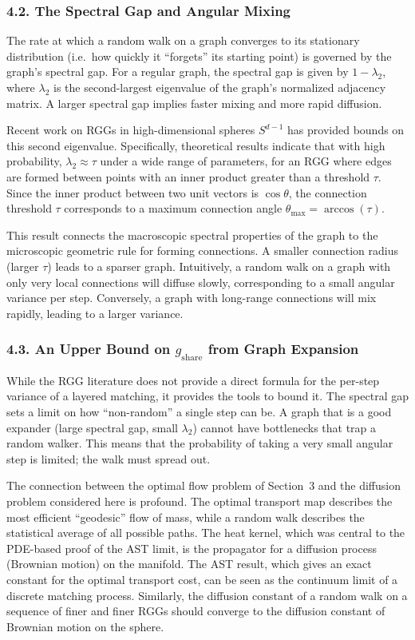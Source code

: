 \documentclass[11pt]{article}
\begin{document}
\subsubsection*{4.2. The Spectral Gap and Angular Mixing}
The rate at which a random walk on a graph converges to its stationary distribution (i.e.\ how quickly it “forgets” its starting point) is governed by the graph’s spectral gap. For a regular graph, the spectral gap is given by $1 - \lambda_2$, where $\lambda_2$ is the second-largest eigenvalue of the graph’s normalized adjacency matrix. A larger spectral gap implies faster mixing and more rapid diffusion.

Recent work on RGGs in high-dimensional spheres $S^{d-1}$ has provided bounds on this second eigenvalue. Specifically, theoretical results indicate that with high probability, $\lambda_2 \approx \tau$ under a wide range of parameters, for an RGG where edges are formed between points with an inner product greater than a threshold $\tau$. Since the inner product between two unit vectors is $\cos\theta$, the connection threshold $\tau$ corresponds to a maximum connection angle $\theta_{\max} = \arccos(\tau)$.

This result connects the macroscopic spectral properties of the graph to the microscopic geometric rule for forming connections. A smaller connection radius (larger $\tau$) leads to a sparser graph. Intuitively, a random walk on a graph with only very local connections will diffuse slowly, corresponding to a small angular variance per step. Conversely, a graph with long-range connections will mix rapidly, leading to a larger variance.

\subsubsection*{4.3. An Upper Bound on $g_{\mathrm{share}}$ from Graph Expansion}
While the RGG literature does not provide a direct formula for the per-step variance of a layered matching, it provides the tools to bound it. The spectral gap sets a limit on how “non-random” a single step can be. A graph that is a good expander (large spectral gap, small $\lambda_2$) cannot have bottlenecks that trap a random walker. This means that the probability of taking a very small angular step is limited; the walk must spread out.

The connection between the optimal flow problem of Section~3 and the diffusion problem considered here is profound. The optimal transport map describes the most efficient “geodesic” flow of mass, while a random walk describes the statistical average of all possible paths. The heat kernel, which was central to the PDE-based proof of the AST limit, is the propagator for a diffusion process (Brownian motion) on the manifold. The AST result, which gives an exact constant for the optimal transport cost, can be seen as the continuum limit of a discrete matching process. Similarly, the diffusion constant of a random walk on a sequence of finer and finer RGGs should converge to the diffusion constant of Brownian motion on the sphere.
\end{document}
